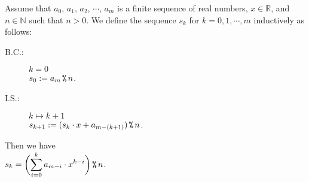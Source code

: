 \begin{Theorem}
   Assume that $a_0$, $a_1$, $a_2$, $\cdots$, $a_m$ is a finite sequence of real numbers, $x \in \mathbb{R}$,
   and $n\in \mathbb{N}$ such that $n > 0$.
   We define the sequence $s_k$ for $k=0,1,\cdots,m$ inductively as follows:
   \begin{description}
   \item[B.C.:] $k = 0$
             \\[0.2cm]
             \hspace*{1.3cm}
             $s_0 := a_m \,\texttt{\%}\, n$.
   \item[I.S.:] $k \mapsto k + 1$
             \\[0.2cm]
             \hspace*{1.3cm}
             $s_{k+1}:= (s_k \cdot x + a_{m - (k + 1)}) \,\texttt{\%}\, n$.
   \end{description}
   Then we have 
   \\[0.2cm]
   \hspace*{1.3cm}
   $\displaystyle s_k = \biggl(\sum\limits_{i=0}^k a_{m - i} \cdot x^{k - i}\biggr) \,\texttt{\%}\, n$.
\end{Theorem}

